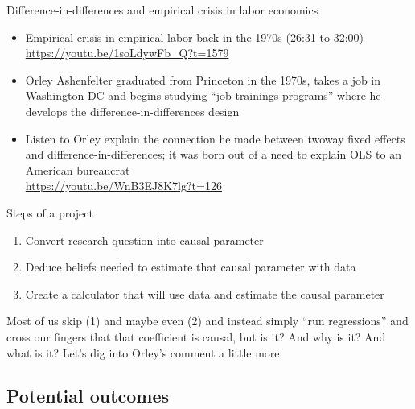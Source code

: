 \documentclass{beamer}
\begin{document}
\begin{frame}{Difference-in-differences and empirical crisis in labor economics}

\begin{itemize}
\item Empirical crisis in empirical labor back in the 1970s (26:31 to 32:00)  \\ \url{https://youtu.be/1soLdywFb_Q?t=1579}
\item Orley Ashenfelter graduated from Princeton in the 1970s, takes a job in Washington DC and begins studying ``job trainings programs'' where he develops the difference-in-differences design
\item Listen to Orley explain the connection he made between twoway fixed effects and difference-in-differences; it was born out of a need to explain OLS to an American bureaucrat
\\ \url{https://youtu.be/WnB3EJ8K7lg?t=126}

\end{itemize}


\end{frame}

\begin{frame}{Steps of a project}

\begin{enumerate}
\item Convert research question into causal parameter
\item Deduce beliefs needed to estimate that causal parameter with data
\item Create a calculator that will use data and estimate the causal parameter
\end{enumerate}

\bigskip

Most of us skip (1) and maybe even (2) and instead simply ``run regressions'' and cross our fingers that that coefficient is causal, but is it? And why is it?  And what is it?  Let's dig into Orley's comment a little more. 

\end{frame}

\subsection{Potential outcomes}
\end{document}
